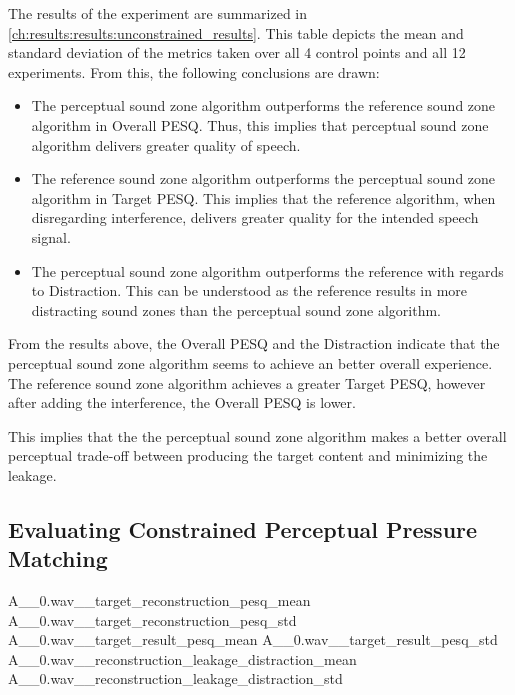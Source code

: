 The results of the experiment are summarized in \autoref{ch:results:results:unconstrained_results}.
This table depicts the mean and standard deviation of the metrics taken over all 4 control points and all 12 experiments.
From this, the following conclusions are drawn:
\begin{itemize}
    \item The perceptual sound zone algorithm outperforms the reference sound zone algorithm in Overall PESQ.
        Thus, this implies that perceptual sound zone algorithm delivers greater quality of speech.
    \item The reference sound zone algorithm outperforms the perceptual sound zone algorithm in Target PESQ.
        This implies that the reference algorithm, when disregarding interference, delivers greater quality for the intended speech signal.
    \item The perceptual sound zone algorithm outperforms the reference with regards to Distraction.
        This can be understood as the reference results in more distracting sound zones than the perceptual sound zone algorithm.
\end{itemize}
From the results above, the Overall PESQ and the Distraction indicate that the perceptual sound zone algorithm seems to 
achieve an better overall experience.
The reference sound zone algorithm achieves a greater Target PESQ, however after adding the interference, the Overall PESQ is lower.

This implies that the the perceptual sound zone algorithm makes a better overall perceptual trade-off between producing the target content 
and minimizing the leakage.




\subsection{Evaluating Constrained Perceptual Pressure Matching}

\constrainingplot
{A__0.wav__target_reconstruction_pesq_mean}
{A__0.wav__target_reconstruction_pesq_std}
{A__0.wav__target_result_pesq_mean}
{A__0.wav__target_result_pesq_std}
{A__0.wav__reconstruction_leakage_distraction_mean}
{A__0.wav__reconstruction_leakage_distraction_std}
